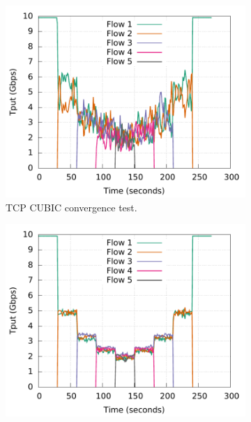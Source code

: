 \begin{figure}[t]
        \centering
        \begin{subfigure}[b]{0.33\textwidth}
                \centering
		\includegraphics[width=\textwidth]{figures/convergence/flowcontrolOFF/tcp_flowcontrolOFF_convergence.pdf}
		\caption{TCP CUBIC convergence test.}
        	\label{cubic_convergence}	
	\end{subfigure}
	\begin{subfigure}[b]{0.33\textwidth}
                \centering
		\includegraphics[width=\textwidth]{figures/convergence/flowcontrolOFF/dctcp_flowcontrolOFF_convergence.pdf}

\end{subfigure}
\end{figure}
